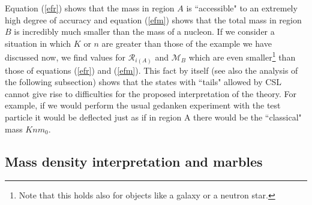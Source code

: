 \documentclass[10pt,a4paper]{article}
\begin{document}
Equation (\ref{efr}) shows that the mass in region $A$ is
``accessible" to an extremely high degree of accuracy and equation
(\ref{efm}) shows that the total mass in region $B$ is incredibly
much smaller than the mass of a nucleon. If we consider a
situation in which $K$ or $n$ are greater than those of the
example we have discussed now, we find values for ${\mathcal
R}_{i(A)}$ and ${\mathcal M}_{B}$ which are even
smaller\footnote{Note that this holds also for objects like a
galaxy or a neutron star.} than those of equations (\ref{efr}) and
(\ref{efm}). This fact by itself (see also the analysis of the
following subsection) shows that the states with ``tails" allowed
by CSL cannot give rise to difficulties for the proposed
interpretation of the theory. For example, if we would perform the
usual gedanken experiment with the test particle it would be
deflected just as if in region A there would be the ``classical"
mass $Knm_{0}$.

\subsection{Mass density interpretation and marbles} \label{sec134}
\end{document}
